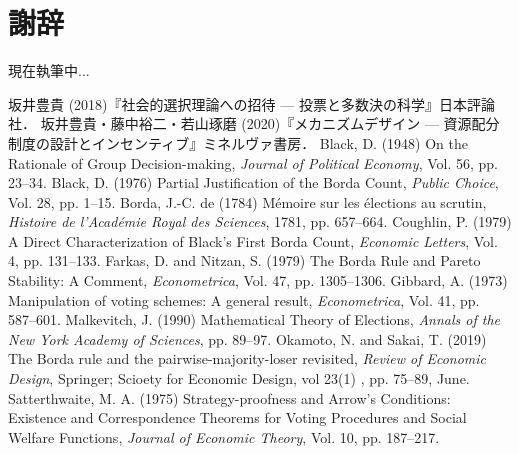 \documentclass[dvipdfmx]{jsarticle}
\begin{document}
\newpage
\section*{謝辞}
現在執筆中...

\newpage
\begin{thebibliography}{9}
  坂井豊貴 (2018)『社会的選択理論への招待 --- 投票と多数決の科学』日本評論社．
  坂井豊貴・藤中裕二・若山琢磨 (2020)『メカニズムデザイン --- 資源配分制度の設計とインセンティブ』ミネルヴァ書房．
  Black, D. (1948) On the Rationale of Group Decision-making, \textit{Journal of Political Economy},
  Vol. 56, pp. 23--34.
  Black, D. (1976) Partial Justification of the Borda Count, \textit{Public Choice},
  Vol. 28, pp. 1--15.
  Borda, J.-C. de (1784) M\'{e}moire sur les \'{e}lections au scrutin, \textit{Histoire de l'Acad\'{e}mie
  Royal des Sciences}, 1781, pp. 657--664.
  Coughlin, P. (1979) A Direct Characterization of Black's First Borda Count,
  \textit{Economic Letters}, Vol. 4, pp. 131--133.
  Farkas, D. and Nitzan, S. (1979) The Borda Rule and Pareto Stability: A Comment,
  \textit{Econometrica}, Vol. 47, pp. 1305--1306.
  Gibbard, A. (1973) Manipulation of voting schemes: A general result, \textit{Econometrica}, Vol. 41,
  pp. 587--601.
    Malkevitch, J. (1990) Mathematical Theory of Elections, \textit{Annals of the New York
    Academy of Sciences}, pp. 89--97.
  Okamoto, N. and Sakai, T. (2019) The Borda rule and the pairwise-majority-loser
  revisited, \textit{Review of Economic Design}, Springer; Scioety for Economic Design, vol 23(1)
  , pp. 75--89, June.
  Satterthwaite, M. A. (1975) Strategy-proofness and Arrow's Conditions:
  Existence and Correspondence Theorems for Voting Procedures and Social
  Welfare Functions, \textit{Journal of Economic Theory}, Vol. 10, pp. 187--217.
\end{thebibliography}
\end{document}
